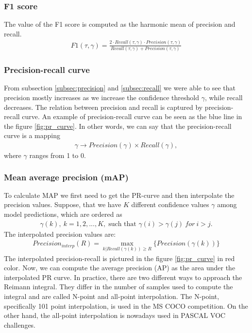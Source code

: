 \subsubsection{F1 score}
The value of the F1 score is computed as the harmonic mean of precision and recall.
\begin{align}
    F1(\tau, \gamma) = \frac{2 \cdot Recall(\tau,\gamma) \cdot Precision(\tau, \gamma)}{Recall(\tau,\gamma) + Precision(\tau, \gamma)}
\end{align}

\subsubsection{Precision-recall curve}
From subsection \ref{subsec:precision} and \ref{subsec:recall} we were able to see that precision mostly increases as we increase the confidence threshold $\gamma$, while recall decreases. The relation between precision and recall is captured by precision-recall curve. An example of precision-recall curve can be seen as the blue line in the figure \ref{fig:pr_curve}. In other words, we can say that the precision-recall curve is a mapping
\begin{align}
    \gamma \rightarrow Precision(\gamma) \times  Recall(\gamma),
    \label{eq:pr_curve}
\end{align}
where $\gamma$ ranges from 1 to 0.

\subsubsection{Mean average precision (mAP)}
To calculate MAP we first need to get the PR-curve and then interpolate the precision values. Suppose, that we have $K$ different confidence values $\gamma$ among model predictions, which are ordered as
\begin{align}
    \gamma(k),\: k = 1,2,...,K,  \; \text{such that } \gamma(i) > \gamma(j) \: for \: i > j.
\end{align}
The interpolated precision values are:
\begin{align}
    Precision_{interp}(R) = \max_{k|Recall(\gamma(k)) \geq R} \{  Precision(\gamma(k)) \}
\end{align}
The interpolated precision-recall is pictured in the figure \ref{fig:pr_curve} in red color. Now, we can compute the average precision (AP) as the area under the interpolated PR curve.
In practice, there are two different ways to approach the Reimann integral. They differ in the number of samples used to compute the integral and are called N-point and all-point interpolation. The N-point, specifically 101 point interpolation, is used in the MS COCO competition. On the other hand, the all-point interpolation is nowadays used in PASCAL VOC challenges.

